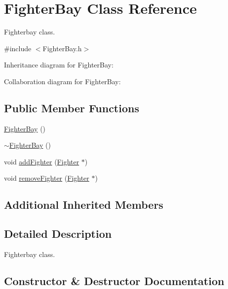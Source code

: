 \hypertarget{classFighterBay}{}\section{Fighter\+Bay Class Reference}
\label{classFighterBay}


Fighterbay class.  




{\ttfamily \#include $<$Fighter\+Bay.\+h$>$}



Inheritance diagram for Fighter\+Bay\+:


Collaboration diagram for Fighter\+Bay\+:
\subsection*{Public Member Functions}
\begin{DoxyCompactItemize}
\item 
\hyperlink{classFighterBay_a7a2ab5524457936b01bbf98cd717ac91}{Fighter\+Bay} ()
\item 
\hyperlink{classFighterBay_aa037d013b598d478aa4314c16081cfc1}{$\sim$\+Fighter\+Bay} ()
\item 
void \hyperlink{classFighterBay_a24764deae3987f30be8825c7673b90a0}{add\+Fighter} (\hyperlink{classFighter}{Fighter} $\ast$)
\item 
void \hyperlink{classFighterBay_ab504d923d2e3837c29c56453bd1f7ba1}{remove\+Fighter} (\hyperlink{classFighter}{Fighter} $\ast$)
\end{DoxyCompactItemize}
\subsection*{Additional Inherited Members}


\subsection{Detailed Description}
Fighterbay class. 

\subsection{Constructor \& Destructor Documentation}
\mbox{\label{classFighterBay_a7a2ab5524457936b01bbf98cd717ac91}} 
